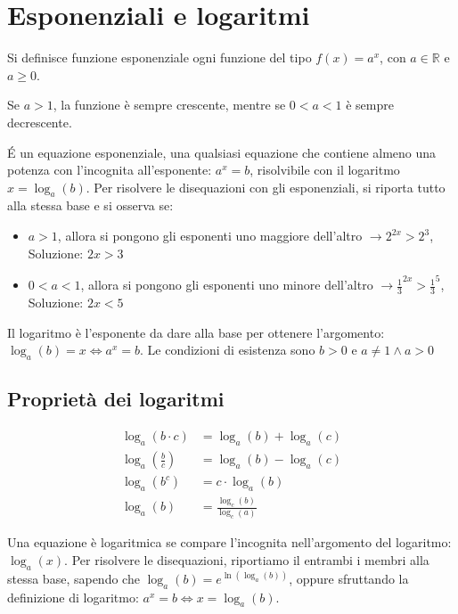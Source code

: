 
\section{Esponenziali e logaritmi}

Si definisce funzione esponenziale ogni funzione del tipo $f(x) = a^x$, con $a \in \mathbb{R}$ e $a \geq 0$.

Se $a > 1$, la funzione è sempre crescente, mentre se $0 < a < 1$ è sempre decrescente.


É un equazione esponenziale, una qualsiasi equazione che contiene almeno una potenza con l'incognita all'esponente: $a^x = b$, risolvibile con il logaritmo $x = \log_a(b)$.
Per risolvere le disequazioni con gli esponenziali, si riporta tutto alla stessa base e si osserva se:
\begin{itemize}
    \item $a > 1$, allora si pongono gli esponenti uno maggiore dell'altro $\rightarrow 2^{2x} > 2^3$, Soluzione: $2x > 3$
    \item $0 < a < 1$, allora si pongono gli esponenti uno minore dell'altro $\rightarrow \frac{1}{3}^{2x} > \frac{1}{3}^5$, Soluzione: $2x < 5$
\end{itemize}

Il logaritmo è l'esponente da dare alla base per ottenere l'argomento: $\log_a(b) = x \iff a^x = b$.
Le condizioni di esistenza sono $b > 0$ e $a \neq 1 \wedge a > 0$


\subsection{Proprietà dei logaritmi}

\begin{align*}
    \log_a(b \cdot c)   & = \log_a(b) + \log_a(c)       \\
    \log_a(\frac{b}{c}) & = \log_a(b) - \log_a(c)       \\
    \log_a(b^c)         & = c \cdot \log_a(b)           \\
    \log_a(b)           & = \frac{\log_c(b)}{\log_c(a)}
    \label{eq:logaritmi_proprieta}
\end{align*}

Una equazione è logaritmica se compare l'incognita nell'argomento del logaritmo: $\log_a(x)$.
Per risolvere le disequazioni, riportiamo il entrambi i membri alla stessa base, sapendo che $\log_a(b) = e^{\ln(\log_a(b))}$, oppure sfruttando la definizione di logaritmo: $a^x = b \iff x = \log_a(b)$.

